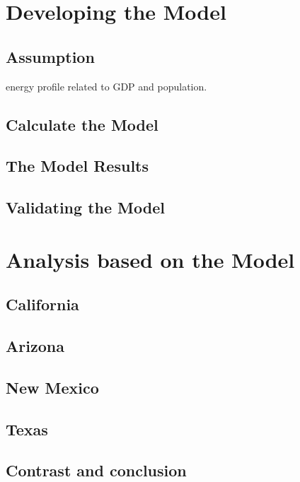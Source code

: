 \documentclass{mcmthesis}
\begin{document}
\section{Developing the Model}
\subsection{Assumption}
energy profile related to GDP and population.
\subsection{Calculate the Model}
\subsection{The Model Results}
\subsection{Validating the Model}

\section{Analysis based on the Model}
\subsection{California}
\subsection{Arizona}
\subsection{New Mexico}
\subsection{Texas}
\subsection{Contrast and conclusion}
\end{document}
